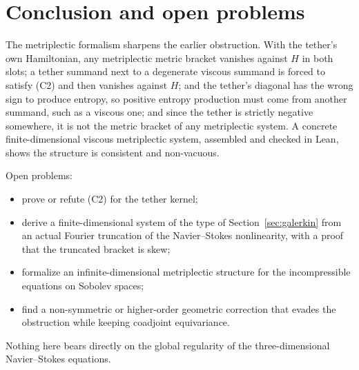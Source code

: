 \documentclass[11pt,a4paper]{article}
\begin{document}
\section{Conclusion and open problems}
The metriplectic formalism sharpens the earlier obstruction. With the tether's own Hamiltonian, any
metriplectic metric bracket vanishes against \(H\) in both slots; a tether summand next to a degenerate
viscous summand is forced to satisfy (C2) and then vanishes against \(H\); and the tether's diagonal has the
wrong sign to produce entropy, so positive entropy production must come from another summand, such as a
viscous one; and since the tether is strictly negative somewhere, it is not the metric bracket of any
metriplectic system. A concrete finite-dimensional viscous metriplectic system, assembled and checked
in Lean, shows the structure is consistent and non-vacuous.

Open problems:
\begin{itemize}
\item prove or refute (C2) for the tether kernel;
\item derive a finite-dimensional system of the type of Section~\ref{sec:galerkin} from an actual Fourier
truncation of the Navier--Stokes nonlinearity, with a proof that the truncated bracket is skew;
\item formalize an infinite-dimensional metriplectic structure for the incompressible equations on Sobolev
spaces;
\item find a non-symmetric or higher-order geometric correction that evades the obstruction while keeping
coadjoint equivariance.
\end{itemize}
Nothing here bears directly on the global regularity of the three-dimensional Navier--Stokes equations.
\end{document}
